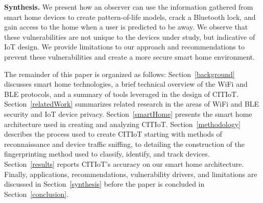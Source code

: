 \textbf{Synthesis.} We present how an observer can use the information gathered from smart home devices to create pattern-of-life models, crack a Bluetooth lock, and gain access to the home when a user is predicted to be away. We observe that these vulnerabilities are not unique to the devices under study, but indicative of \ac{IoT} design. We provide limitations to our approach and recommendations to prevent these vulnerabilities and create a more secure smart home environment.

The remainder of this paper is organized as follows: Section~\ref{background} discusses smart home technologies, a brief technical overview of the WiFi and \ac{BLE} protocols, and a summary of tools leveraged in the design of CITIoT. Section~\ref{relatedWork} summarizes related research in the areas of WiFi and \ac{BLE} security and \ac{IoT} device privacy. Section~\ref{smartHome} presents the smart home architecture used in creating and analyzing CITIoT. Section~\ref{methodology} describes the process used to create CITIoT starting with methods of reconnaissance and device traffic sniffing, to detailing the construction of the fingerprinting method used to classify, identify, and track devices. Section~\ref{results} reports CITIoT's accuracy on our smart home architecture. Finally, applications, recommendations, vulnerability drivers, and limitations are discussed in Section~\ref{synthesis} before the paper is concluded in Section~\ref{conclusion}.  
